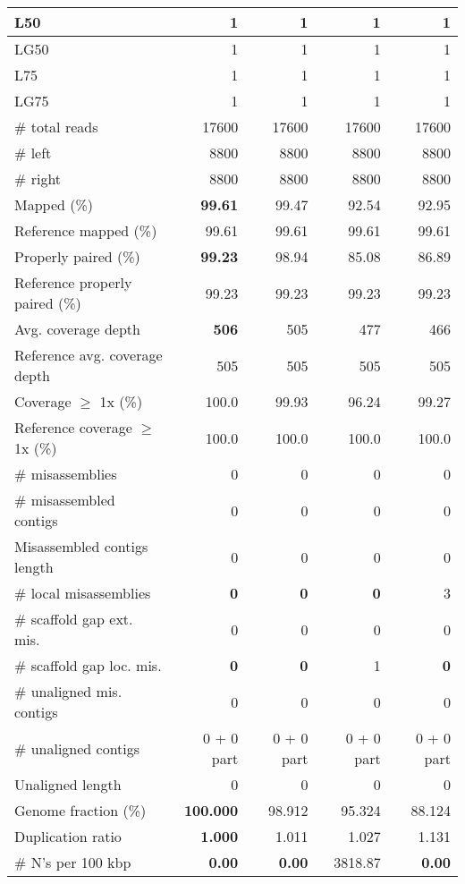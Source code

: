 \documentclass[12pt,a4paper]{article}
\begin{document}
\begin{table}[ht]
\begin{center}
\begin{tabular}{|l*{4}{|r}|}
L50 & 1 & 1 & 1 & 1 \\ \hline
LG50 & 1 & 1 & 1 & 1 \\ \hline
L75 & 1 & 1 & 1 & 1 \\ \hline
LG75 & 1 & 1 & 1 & 1 \\ \hline
\# total reads & 17600 & 17600 & 17600 & 17600 \\ \hline
\# left & 8800 & 8800 & 8800 & 8800 \\ \hline
\# right & 8800 & 8800 & 8800 & 8800 \\ \hline
Mapped (\%) & {\bf 99.61} & 99.47 & 92.54 & 92.95 \\ \hline
Reference mapped (\%) & 99.61 & 99.61 & 99.61 & 99.61 \\ \hline
Properly paired (\%) & {\bf 99.23} & 98.94 & 85.08 & 86.89 \\ \hline
Reference properly paired (\%) & 99.23 & 99.23 & 99.23 & 99.23 \\ \hline
Avg. coverage depth & {\bf 506} & 505 & 477 & 466 \\ \hline
Reference avg. coverage depth & 505 & 505 & 505 & 505 \\ \hline
Coverage $\geq$ 1x (\%) & 100.0 & 99.93 & 96.24 & 99.27 \\ \hline
Reference coverage $\geq$ 1x (\%) & 100.0 & 100.0 & 100.0 & 100.0 \\ \hline
\# misassemblies & 0 & 0 & 0 & 0 \\ \hline
\# misassembled contigs & 0 & 0 & 0 & 0 \\ \hline
Misassembled contigs length & 0 & 0 & 0 & 0 \\ \hline
\# local misassemblies & {\bf 0} & {\bf 0} & {\bf 0} & 3 \\ \hline
\# scaffold gap ext. mis. & 0 & 0 & 0 & 0 \\ \hline
\# scaffold gap loc. mis. & {\bf 0} & {\bf 0} & 1 & {\bf 0} \\ \hline
\# unaligned mis. contigs & 0 & 0 & 0 & 0 \\ \hline
\# unaligned contigs & 0 + 0 part & 0 + 0 part & 0 + 0 part & 0 + 0 part \\ \hline
Unaligned length & 0 & 0 & 0 & 0 \\ \hline
Genome fraction (\%) & {\bf 100.000} & 98.912 & 95.324 & 88.124 \\ \hline
Duplication ratio & {\bf 1.000} & 1.011 & 1.027 & 1.131 \\ \hline
\# N's per 100 kbp & {\bf 0.00} & {\bf 0.00} & 3818.87 & {\bf 0.00} \\ \hline

\end{tabular}
\end{center}
\end{table}
\end{document}
